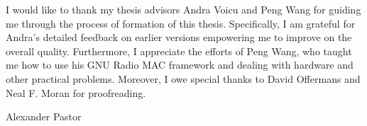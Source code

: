 I would like to thank my thesis advisors Andra Voicu and Peng Wang for guiding me through the process of formation of this thesis. Specifically, I am grateful for Andra's detailed feedback on earlier versions empowering me to improve on the overall quality. Furthermore, I appreciate the efforts of Peng Wang, who taught me how to use his GNU Radio MAC framework and dealing with hardware and other practical problems. 
Moreover, I owe special thanks to David Offermans and Neal F. Moran for proofreading.

\bigskip
\noindent Alexander Pastor